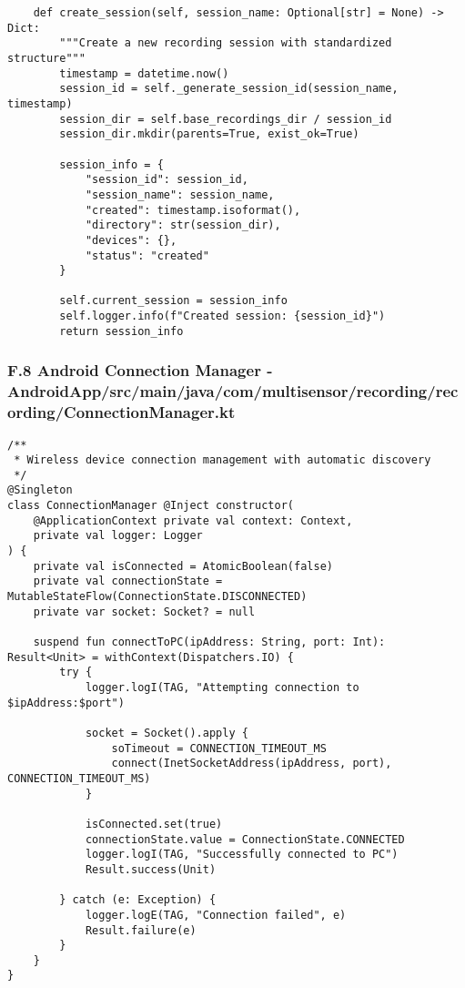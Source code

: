 \documentclass[11pt,a4paper]{report}
\begin{document}
{{\begin{verbatim}
    def create_session(self, session_name: Optional[str] = None) -> Dict:
        """Create a new recording session with standardized structure"""
        timestamp = datetime.now()
        session_id = self._generate_session_id(session_name, timestamp)
        session_dir = self.base_recordings_dir / session_id
        session_dir.mkdir(parents=True, exist_ok=True)

        session_info = {
            "session_id": session_id,
            "session_name": session_name,
            "created": timestamp.isoformat(),
            "directory": str(session_dir),
            "devices": {},
            "status": "created"
        }

        self.current_session = session_info
        self.logger.info(f"Created session: {session_id}")
        return session_info
\end{verbatim}

\subsubsection{F.8 Android Connection Manager - AndroidApp/src/main/java/com/multisensor/recording/recording/ConnectionManager.kt}

\begin{verbatim}
/**
 * Wireless device connection management with automatic discovery
 */
@Singleton
class ConnectionManager @Inject constructor(
    @ApplicationContext private val context: Context,
    private val logger: Logger
) {
    private val isConnected = AtomicBoolean(false)
    private val connectionState = MutableStateFlow(ConnectionState.DISCONNECTED)
    private var socket: Socket? = null

    suspend fun connectToPC(ipAddress: String, port: Int): Result<Unit> = withContext(Dispatchers.IO) {
        try {
            logger.logI(TAG, "Attempting connection to $ipAddress:$port")

            socket = Socket().apply {
                soTimeout = CONNECTION_TIMEOUT_MS
                connect(InetSocketAddress(ipAddress, port), CONNECTION_TIMEOUT_MS)
            }

            isConnected.set(true)
            connectionState.value = ConnectionState.CONNECTED
            logger.logI(TAG, "Successfully connected to PC")
            Result.success(Unit)

        } catch (e: Exception) {
            logger.logE(TAG, "Connection failed", e)
            Result.failure(e)
        }
    }
}
\end{verbatim}

}}
\end{document}
